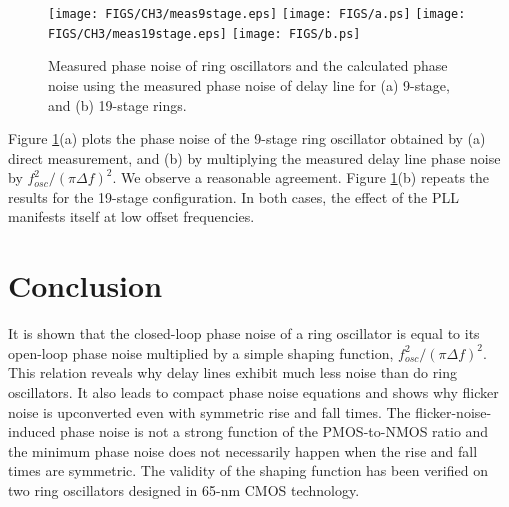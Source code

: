 \begin{figure}[htb!]
\centering
\texttt{[image: FIGS/CH3/meas9stage.eps]}
\texttt{[image: FIGS/a.ps]}
\texttt{[image: FIGS/CH3/meas19stage.eps]}
\texttt{[image: FIGS/b.ps]}
\caption{Measured phase noise of ring oscillators and the calculated phase noise using the measured phase noise of delay line for (a) 9-stage, and (b) 19-stage rings.}
\label{fig:meas}
\end{figure}

Figure \ref{fig:meas}(a) plots the phase noise of the 9-stage ring oscillator obtained by (a) direct measurement, and (b) by multiplying the measured delay line phase noise
by $f_{osc}^2/(\pi \Delta f)^2$. We observe a reasonable agreement. Figure \ref{fig:meas}(b) repeats the results for the 19-stage configuration. In both cases, the effect of
the PLL manifests itself at low offset frequencies.



\section{Conclusion}

It is shown that the closed-loop phase noise of a ring oscillator is equal to its open-loop phase noise multiplied by a simple shaping function, $f_{osc}^2/(\pi \Delta f)^2$. This relation
reveals why delay lines exhibit much less noise than do ring oscillators. It also leads to compact phase noise equations and shows why flicker noise is
upconverted even with symmetric rise and fall times. The flicker-noise-induced phase noise is not a strong function of the PMOS-to-NMOS ratio and the minimum phase noise
does not necessarily happen when the rise and fall times are symmetric.
The validity of the shaping function has been verified on two ring oscillators designed in 65-nm CMOS technology.

